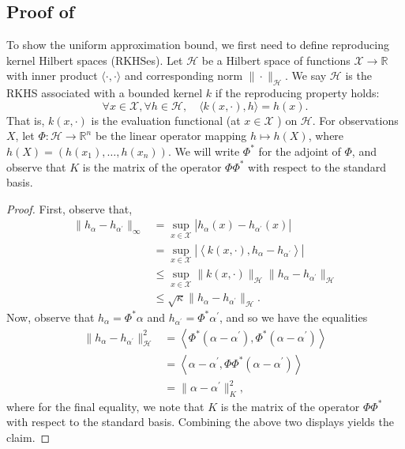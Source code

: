 \subsection{Proof of }
\label{app:proof_uniform_approximation}

To show the uniform approximation bound, we first need to define reproducing kernel Hilbert spaces (RKHSes). Let $\mathcal{H}$ be a Hilbert space of functions $\mathcal{X} \rightarrow \mathbb{R}$ with inner product $\langle\cdot, \cdot\rangle$ and corresponding norm $\|\cdot\|_{\mathcal{H}}$. We say $\mathcal{H}$ is the RKHS associated with a bounded kernel $k$ if the reproducing property holds:
\[
\forall x \in \mathcal{X}, \forall h \in \mathcal{H}, \quad\langle k(x, \cdot), h\rangle=h(x).
\]
That is, $k(x, \cdot)$ is the evaluation functional (at $x \in \mathcal{X}$ ) on $\mathcal{H}$. For observations $X$, let $\Phi: \mathcal{H} \rightarrow \mathbb{R}^n$ be the linear operator mapping $h \mapsto h(X)$, where $h(X)=\left(h\left(x_1\right), \ldots, h\left(x_n\right)\right)$. We will write $\Phi^*$ for the adjoint of $\Phi$, and observe that $K$ is the matrix of the operator $\Phi \Phi^*$ with respect to the standard basis.
\begin{proof}
First, observe that,
\[
\begin{aligned}
\|h_\alpha-h_{\alpha^{\prime}}\|_{\infty} & =\sup _{x \in \mathcal{X}}\left|h_\alpha(x)-h_{\alpha^{\prime}}(x)\right| \\
& =\sup _{x \in \mathcal{X}}\left|\left\langle k(x, \cdot), h_\alpha-h_{\alpha^{\prime}}\right\rangle\right| \\
& \leq \sup _{x \in \mathcal{X}}\|k(x, \cdot)\|_{\mathcal{H}}\|h_\alpha-h_{\alpha^{\prime}}\|_{\mathcal{H}} \\
& \leq \sqrt{\kappa}\|h_\alpha-h_{\alpha^{\prime}}\|_{\mathcal{H}}.
\end{aligned}
\]
Now, observe that $h_\alpha=\Phi^* \alpha$ and $h_{\alpha^{\prime}}=\Phi^* \alpha^{\prime}$, and so we have the equalities
\[
\begin{aligned}
\|h_\alpha-h_{\alpha^{\prime}}\|_{\mathcal{H}}^2 & =\left\langle\Phi^*\left(\alpha-\alpha^{\prime}\right), \Phi^*\left(\alpha-\alpha^{\prime}\right)\right\rangle \\
& =\left\langle\alpha-\alpha^{\prime}, \Phi \Phi^*\left(\alpha-\alpha^{\prime}\right)\right\rangle \\
& =\|\alpha-\alpha^{\prime}\|_K^2,
\end{aligned}
\]
where for the final equality, we note that $K$ is the matrix of the operator $\Phi \Phi^*$ with respect to the standard basis. Combining the above two displays yields the claim.
\end{proof}

